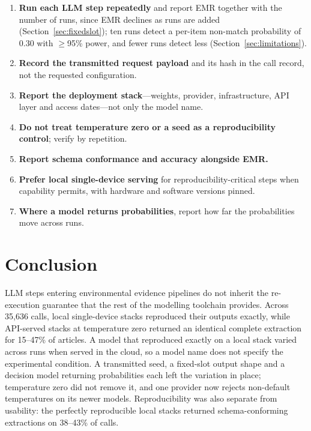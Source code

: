 \documentclass[preprint,review,12pt,authoryear]{elsarticle}
\begin{document}
\begin{enumerate}
  \item \textbf{Run each LLM step repeatedly} and report EMR together with the number of runs, since EMR declines as runs are added (Section~\ref{sec:fixedslot}); ten runs detect a per-item non-match probability of 0.30 with $\geq$95\% power, and fewer runs detect less (Section~\ref{sec:limitations}).
  \item \textbf{Record the transmitted request payload} and its hash in the call record, not the requested configuration.
  \item \textbf{Report the deployment stack}---weights, provider, infrastructure, API layer and access dates---not only the model name.
  \item \textbf{Do not treat temperature zero or a seed as a reproducibility control}; verify by repetition.
  \item \textbf{Report schema conformance and accuracy alongside EMR.}
  \item \textbf{Prefer local single-device serving} for reproducibility-critical steps when capability permits, with hardware and software versions pinned.
  \item \textbf{Where a model returns probabilities}, report how far the probabilities move across runs.
\end{enumerate}


\section{Conclusion}

LLM steps entering environmental evidence pipelines do not inherit the re-execution guarantee that the rest of the modelling toolchain provides. Across 35{,}636 calls, local single-device stacks reproduced their outputs exactly, while API-served stacks at temperature zero returned an identical complete extraction for 15--47\% of articles. A model that reproduced exactly on a local stack varied across runs when served in the cloud, so a model name does not specify the experimental condition. A transmitted seed, a fixed-slot output shape and a decision model returning probabilities each left the variation in place; temperature zero did not remove it, and one provider now rejects non-default temperatures on its newer models. Reproducibility was also separate from usability: the perfectly reproducible local stacks returned schema-conforming extractions on 38--43\% of calls.
\end{document}
